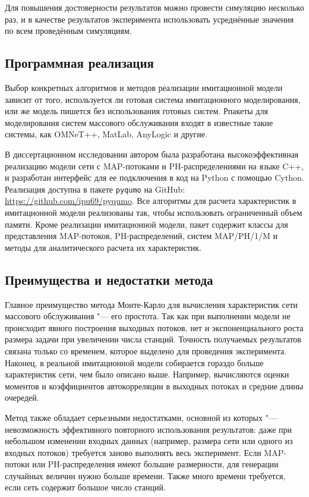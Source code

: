 Для повышения достоверности результатов можно провести симуляцию несколько раз, и в качестве результатов эксперимента использовать усреднённые значения по всем проведённым симуляциям.



\subsection{Программная реализация}

Выбор конкретных алгоритмов и методов реализации имитационной модели зависит от того, используется ли готовая система имитационного моделирования, или же модель пишется без использования готовых систем. Рпакеты для моделирования систем массового обслуживания входят в известные такие системы, как OMNeT++, MatLab, AnyLogic и другие.

В диссертационном исследовании автором была разработана высокоэффективная реализацию модели сети с MAP-потоками и PH-распределениями на языке C++, и разработан интерфейс для ее подключения в код на Python с помощью Cython. Реализация доступна в пакете \texttt{pyqumo} на GitHub: \url{https://github.com/ipu69/pyqumo}. Все алгоритмы для расчета характеристик в имитационной модели реализованы так, чтобы использовать ограниченный объем памяти. Кроме реализации имитационной модели, пакет содержит классы для представления MAP-потоков, PH-распределений, систем MAP/PH/1/M и методы для аналитического расчета их характеристик.


\subsection{Преимущества и недостатки метода}
Главное преимущество метода Монте-Карло для вычисления характеристик сети массового обслуживания "--- его простота. Так как при выполнении модели не происходит явного построения выходных потоков, нет и экспоненциального роста размера задачи при увеличении числа станций. Точность получаемых результатов связана только со временем, которое выделено для проведения эксперимента. Наконец, в реальной имитационной модели собирается гораздо больше характеристик сети, чем было описано выше. Например, вычисляются оценки моментов и коэффициентов автокорреляции в выходных потоках и средние длины очередей.

Метод также обладает серьезными недостатками, основной из которых "--- невозможность эффективного повторного использования результатов: даже при небольшом изменении входных данных (например, размера сети или одного из входных потоков) требуется заново выполнять весь эксперимент. Если MAP-потоки или PH-распределения имеют большие размерности, для генерации случайных величин нужно больше времени. Также много времени требуется, если сеть содержит большое число станций.

